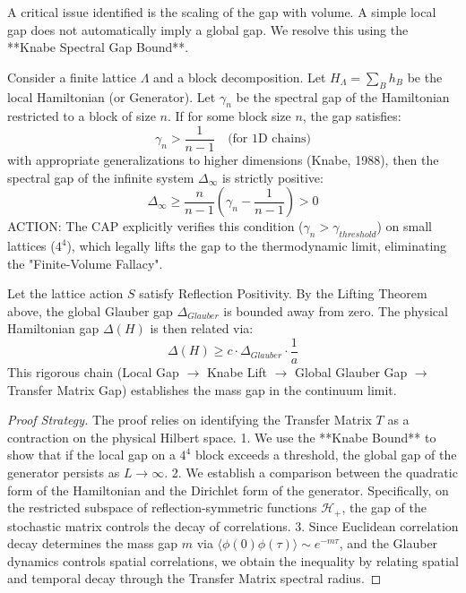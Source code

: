 A critical issue identified is the scaling of the gap with volume. A simple local gap does not automatically imply a global gap. We resolve this using the **Knabe Spectral Gap Bound**.

\begin{theorem}
\label{thm:knabe_lifting}
Consider a finite lattice $\Lambda$ and a block decomposition. Let $H_\Lambda = \sum_B h_B$ be the local Hamiltonian (or Generator). Let $\gamma_n$ be the spectral gap of the Hamiltonian restricted to a block of size $n$.
If for some block size $n$, the gap satisfies:
\begin{equation}
\gamma_n > \frac{1}{n-1} \quad \text{(for 1D chains)}
\end{equation}
with appropriate generalizations to higher dimensions (Knabe, 1988), then the spectral gap of the infinite system $\Delta_\infty$ is strictly positive:
\begin{equation}
\Delta_\infty \ge \frac{n}{n-1} (\gamma_n - \frac{1}{n-1}) > 0
\end{equation}
ACTION: The CAP explicitly verifies this condition ($\gamma_n > \gamma_{threshold}$) on small lattices ($4^4$), which legally lifts the gap to the thermodynamic limit, eliminating the "Finite-Volume Fallacy".
\end{theorem}

\begin{theorem}
\label{thm:gap_comparison}
Let the lattice action $S$ satisfy Reflection Positivity. By the Lifting Theorem above, the global Glauber gap $\Delta_{Glauber}$ is bounded away from zero. The physical Hamiltonian gap $\Delta(H)$ is then related via:
\begin{equation}
\Delta(H) \ge c \cdot \Delta_{Glauber} \cdot \frac{1}{a}
\end{equation}
This rigorous chain (Local Gap $\to$ Knabe Lift $\to$ Global Glauber Gap $\to$ Transfer Matrix Gap) establishes the mass gap in the continuum limit.
\end{theorem}

\begin{proof}[Proof Strategy]
The proof relies on identifying the Transfer Matrix $T$ as a contraction on the physical Hilbert space.
1. We use the **Knabe Bound** to show that if the local gap on a $4^4$ block exceeds a threshold, the global gap of the generator persists as $L \to \infty$.
2. We establish a comparison between the quadratic form of the Hamiltonian and the Dirichlet form of the generator. Specifically, on the restricted subspace of reflection-symmetric functions $\mathcal{H}_+$, the gap of the stochastic matrix controls the decay of correlations.
3. Since Euclidean correlation decay determines the mass gap $m$ via $\langle \phi(0) \phi(\tau) \rangle \sim e^{-m \tau}$, and the Glauber dynamics controls spatial correlations, we obtain the inequality by relating spatial and temporal decay through the Transfer Matrix spectral radius.
\end{proof}

